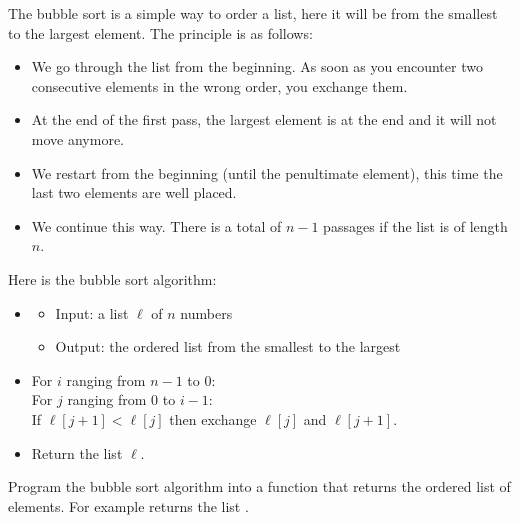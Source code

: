 \documentclass[11pt,class=report,crop=false]{standalone}
\begin{document}
\begin{activite}


The bubble sort is a simple way to order a list, here it will be from the smallest to the largest element.
The principle is as follows:
\begin{itemize}
  \item We go through the list from the beginning. As soon as you encounter two consecutive elements in the wrong order, you exchange them. 
  \item At the end of the first pass, the largest element is at the end and it will not move anymore.
  \item We restart from the beginning (until the penultimate element), this time the last two elements are well placed.
  \item We continue this way. There is a total of $n-1$ passages if the list is of length $n$. 
\end{itemize}



\medskip

Here is the bubble sort algorithm:
  \begin{algorithme}
  \sauteligne 
 \begin{itemize}
   \item
   \begin{itemize}
     \item Input: a list $\ell$ of $n$ numbers
     \item Output: the ordered list from the smallest to the largest
   \end{itemize}

   \item For $i$ ranging from $n-1$ to $0$:\\
   \indentation For $j$ ranging from $0$ to $i-1$:\\
   \indentation\indentation If $\ell[j+1] < \ell[j]$ then exchange $\ell[j]$ and $\ell[j+1]$.
   \item Return the list $\ell$.
 \end{itemize}  
 \end{algorithme}
 

Program the bubble sort algorithm into a  function that returns the ordered list of elements. For example  returns the list \ci{[4,6,6,7,8,11,12,13]}.


\end{activite}
\end{document}
